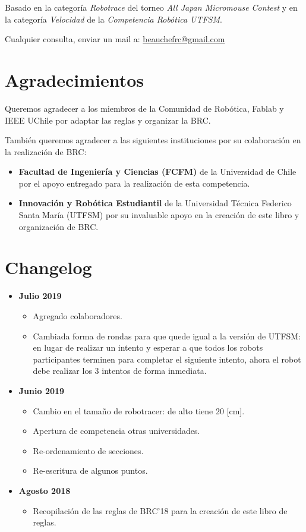 Basado en la categoría \emph{Robotrace} del torneo \emph{All Japan Micromouse Contest} y en la categoría \emph{Velocidad} de la \emph{Competencia Robótica UTFSM}.

Cualquier consulta, enviar un mail a: \href{mailto:beauchefrc@gmail.com}{beauchefrc@gmail.com}

\section*{Agradecimientos}

Queremos agradecer a los miembros de la Comunidad de Robótica, Fablab y IEEE UChile por adaptar las reglas y organizar la BRC.

También queremos agradecer a las siguientes instituciones por su colaboración en la realización de BRC:

\begin{itemize}
   \item \textbf{Facultad de Ingeniería y Ciencias (FCFM)} de la Universidad de Chile por el apoyo entregado para la realización de esta competencia. 
   \item  \textbf{Innovación y Robótica Estudiantil} de la Universidad Técnica Federico Santa María (UTFSM) por su invaluable apoyo en la creación de este libro y organización de BRC.
 \end{itemize} 


\section*{Changelog}

\begin{itemize}
  \item \textbf{Julio 2019}
  \begin{itemize}
    \item Agregado colaboradores.
    \item Cambiada forma de rondas para que quede igual a la versión de UTFSM: en lugar de realizar un intento y esperar a que todos los robots participantes terminen para completar el siguiente intento, ahora el robot debe realizar los 3 intentos de forma inmediata.
  \end{itemize}
  \item \textbf{Junio 2019}
  \begin{itemize}
    \item Cambio en el tamaño de robotracer: de alto tiene 20 [cm].
    \item Apertura de competencia otras universidades.
    \item Re-ordenamiento de secciones.
    \item Re-escritura de algunos puntos.
  \end{itemize}
  \item \textbf{Agosto 2018}
  \begin{itemize}
    \item Recopilación de las reglas de BRC'18 para la creación de este libro de reglas.
  \end{itemize}
\end{itemize}

